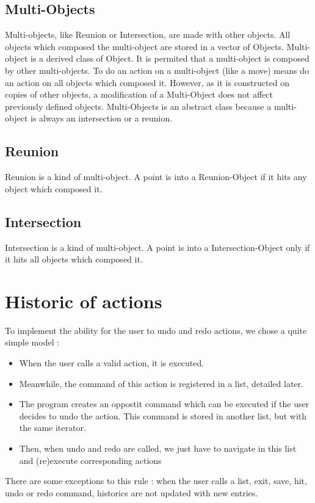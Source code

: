 \documentclass[a4paper, 12pts]{article}
\begin{document}
    \subsection{Multi-Objects}
        Multi-objects, like Reunion or Intersection, are made with other objects. All objects which composed the multi-object are
        stored in a vector of Objects. Multi-object is a derived class of Object. It is permited that a multi-object is composed
        by other multi-objects. To do an action on a multi-object (like a move) means do an action on all objects which composed it. However, as it is constructed on copies of other objects, a modification of a Multi-Object does not affect previously defined objects.
        Multi-Objects is an abstract class because a multi-object is always an intersection or a reunion.
    \subsection{Reunion}
        Reunion is a kind of multi-object. A point is into a Reunion-Object if it hits any object which composed it.
    \subsection{Intersection}
        Intersection is a kind of multi-object. A point is into a Intersection-Object only if it hits all objects which composed it.

\section{Historic of actions}
    To implement the ability for the user to undo and redo actions, we chose a quite simple model :
    \begin{itemize}
        \item When the user calls a valid action, it is executed.
        \item Meanwhile, the command of this action is registered in a list, detailed later.
        \item The program creates an oppostit command which can be executed if the user decides to undo the action.
        This command is stored in another list, but with the same iterator.
        \item Then, when undo and redo are called, we just have to navigate in this list and (re)execute corresponding
        actions
    \end{itemize}
	There are some exceptions to this rule : when the user calls a list, exit, save, hit, undo or redo command, historics are not updated with new entries.
\end{document}
